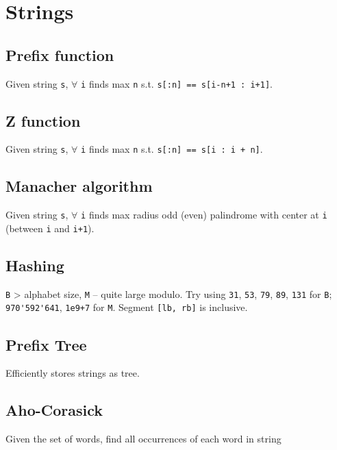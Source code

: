 \section{Strings}

\subsection{Prefix function}
Given string \verb|s|, $\forall$ \verb|i| finds max \verb|n| s.t. \verb|s[:n] == s[i-n+1 : i+1]|.

\subsection{Z function}
Given string \verb|s|, $\forall$ \verb|i| finds max \verb|n| s.t. \verb|s[:n] == s[i : i + n]|.

\subsection{Manacher algorithm}
Given string \verb|s|, $\forall$ \verb|i| finds max radius odd (even) palindrome with center at \verb|i| (between \verb|i| and \verb|i+1|).

\subsection{Hashing}
\verb|B| > alphabet size, \verb|M| -- quite large modulo.
Try using \verb|31|, \verb|53|, \verb|79|, \verb|89|, \verb|131| for \verb|B|; \verb|970'592'641|, \verb|1e9+7| for \verb|M|.
Segment \verb|[lb, rb]| is inclusive.

\subsection{Prefix Tree}

Efficiently stores strings as tree.

\subsection{Aho-Corasick}

Given the set of words, find all occurrences of each word in string
